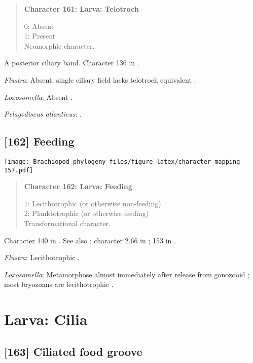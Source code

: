 \documentclass[openany]{book}
\theoremstyle{definition}
\theoremstyle{definition}
\theoremstyle{definition}
\theoremstyle{remark}
\begin{document}
\begin{quote}
\textbf{Character 161: Larva: Telotroch}

0: Absent\\
1: Present\\
Neomorphic character.
\end{quote}

A posterior ciliary band. Character 136 in \citet{Rouse1999}.

\hypertarget{Flustra-coding-161}{}
\emph{Flustra}: Absent; single ciliary field lacks telotroch equivalent
\citep{Reed1982}.

\hypertarget{Loxosomella-coding-161}{}
\emph{Loxosomella}: Absent \citep{Zimmer2013}.

\hypertarget{Pelagodiscus_atlanticus-coding-161}{}
\emph{Pelagodiscus atlanticus}: \citet{Williams1997Introduction}.

\subsection*{{[}162{]} Feeding}\label{feeding}

\texttt{[image: Brachiopod\_phylogeny\_files/figure-latex/character-mapping-157.pdf]}

\begin{quote}
\textbf{Character 162: Larva: Feeding}

1: Lecithotrophic (or otherwise non-feeding)\\
2: Planktotrophic (or otherwise feeding)\\
Transformational character.
\end{quote}

Character 140 in \citet{Rouse1999}. See also \citet{Collin1997};
character 2.66 in \citet{SPS1996}; 153 in \citet{Giribet2002}.

\hypertarget{Flustra-coding-162}{}
\emph{Flustra}: Lecithotrophic \citep{Reed1982}.

\hypertarget{Loxosomella-coding-162}{}
\emph{Loxosomella}: Metamorphose almost immediately after release from
gonozooid \citep{Zimmer2013}; most bryozoans are lecithotrophic
\citep{Reed1982}.

\section{Larva: Cilia}\label{larva-cilia}

\subsection*{{[}163{]} Ciliated food groove}\label{ciliated-food-groove}
\end{document}
